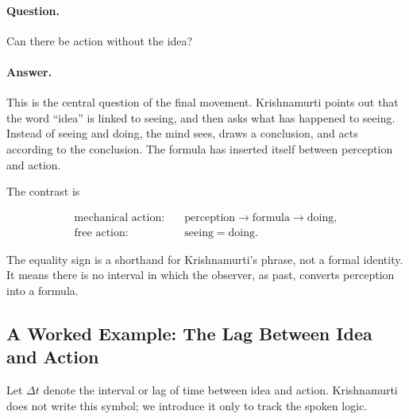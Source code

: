 \paragraph{Question.}
Can there be action without the idea?

\paragraph{Answer.}
This is the central question of the final movement. Krishnamurti points out that the word ``idea'' is linked to seeing, and then asks what has happened to seeing. Instead of seeing and doing, the mind sees, draws a conclusion, and acts according to the conclusion. The formula has inserted itself between perception and action.

The contrast is

\begin{align}
\text{mechanical action:}\quad
&\text{perception}
\rightarrow
\text{formula}
\rightarrow
\text{doing},\\
\text{free action:}\quad
&\text{seeing}
=
\text{doing}.
\end{align}

The equality sign is a shorthand for Krishnamurti's phrase, not a formal identity. It means there is no interval in which the observer, as past, converts perception into a formula.

\subsection{A Worked Example: The Lag Between Idea and Action}

Let \(\Delta t\) denote the interval or lag of time between idea and action. Krishnamurti does not write this symbol; we introduce it only to track the spoken logic.

